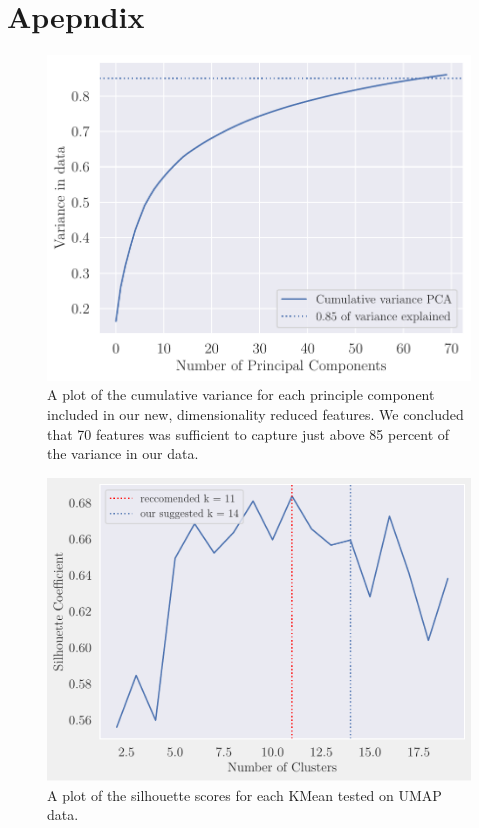 \section{Apepndix}
\begin{figure}[H]
    \centering
    \includegraphics[width=0.9\linewidth]{examples/tests_eb/figs/cumsum_pca.pdf}
    \caption{A plot of the cumulative variance for each principle component included in our new, dimensionality reduced features. We concluded that 70 features was sufficient to capture just above 85 percent of the variance in our data.}
    \label{fig:cumsumpca}
\end{figure}

\begin{figure}[H]
    \centering
    \includegraphics[width=0.9\linewidth]{examples/tests_eb/figs/kmean_sil.pdf}
    \caption{A plot of the silhouette scores for each KMean tested on UMAP data.}
    \label{fig_cumsumpca}
\end{figure}


